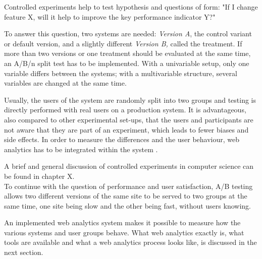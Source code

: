 Controlled experiments help to test hypothesis and questions of form: "If I change feature X, will it help to improve the key performance indicator Y?"

To answer this question,  two systems are needed: \textit{Version A}, the control variant or default version, and a slightly different \textit{Version B,} called the treatment.
If more than two versions or one treatment should be evaluated at the same time,  an A/B/n split test has to be implemented.
With a univariable setup, only one variable differs between the systems; with a multivariable structure, several variables are changed at the same time.

Usually, the users of the system are randomly split into two groups and testing is directly performed with real users on a production system.
It is advantageous, also compared to other experimental set-ups, that the users and participants are not aware that they are part of an experiment, which leads to fewer biases and side effects.
In order to measure the differences and the user behaviour, web analytics has to be integrated within the system \cite{2016Kohavi}.


A brief and general discussion of controlled experiments in computer science can be found in chapter X.  %
\\

To continue with the question of performance and user satisfaction, A/B testing allows two different versions of the same site to be served to two groups at the same time, one site being slow and the other being fast, without users knowing.

An implemented web analytics system makes it possible to measure how the various systems and user groups behave.
What web analytics exactly is, what tools are available and what a web analytics process looks like, is discussed in the next section.




